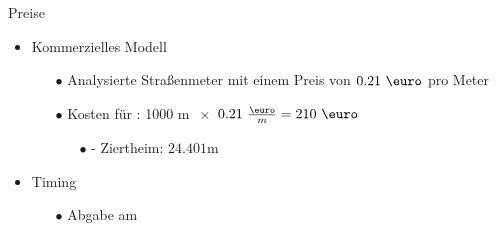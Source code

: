\documentclass[11pt, dvipsnames,aspectratio=169]{beamer}
\begin{document}
\begin{frame}{Preise \Ort}
	\begin{itemize}
		\setlength{\itemsep}{5pt} 
		\item Kommerzielles Modell
		\begin{itemize}
			\item[$\bullet$] Analysierte Straßenmeter mit einem Preis von $0.21~\text{\euro}$ pro Meter
			\item[$\bullet$] Kosten für \Ort: 1000 m $\:\times$ $0.21~\frac{\text{\euro}}{m} = 210~\text{\euro}$
			\begin{itemize}
				\item[$\bullet$] \Ort{} - Ziertheim: $24.401$m
			\end{itemize}
		\end{itemize}
		\item Timing
		\begin{itemize}
			\item[$\bullet$] Abgabe am \Abgabedatum
		\end{itemize}
	\end{itemize}
\end{frame}
\end{document}
